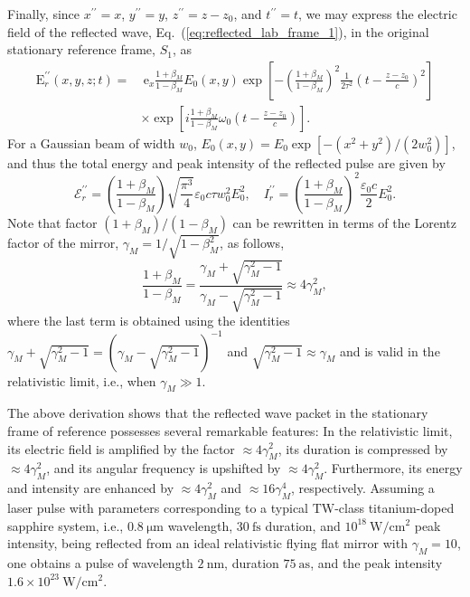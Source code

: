 \documentclass[10pt, a4paper, twoside, openright]{report}
\renewcommand{\vec}[1]{\boldsymbol{\mathrm{#1}}}
\begin{document}
Finally, since $ x^{\prime \prime} = x $, $ y^{\prime \prime} = y $, $ z^{\prime \prime} = z - z_0 $, and $ t^{\prime \prime} = t $, we may express the electric field of the reflected wave, Eq.~(\ref{eq:reflected_lab_frame_1}), in the original stationary reference frame, $ S_1 $, as
\begin{equation}\label{eq:reflected_lab_frame_2}
\begin{split}
\vec{E}^{\prime \prime}_r \left(x, y, z; t \right) = & \ \vec{e}_x \frac{1 + \beta_M}{1 - \beta_M} E_0 \left(x, y \right) \exp \left[ - \left(\frac{1 + \beta_M}{1 - \beta_M}\right)^2 \frac{1}{2 \tau^2} \left(t - \frac{z - z_0}{c}\right)^2 \right] \\ 
& \times \exp \left[ i \frac{1 + \beta_M}{1 - \beta_M} \omega_0 \left(t - \frac{z - z_0}{c}\right) \right].
\end{split}
\end{equation}
For a Gaussian beam of width $ w_0 $, $ E_0 \left( x, y \right) = E_0 \exp \left[-\left( x^2 + y^2 \right) / \left( 2 w_0^2 \right) \right] $, and thus the total energy and peak intensity of the reflected pulse are given by 
\begin{equation}\label{eq:energy_and_intensity}
\mathcal{E}^{\prime \prime}_r = \left(\frac{1 + \beta_M}{1 - \beta_M}\right) \sqrt{\frac{\pi^3}{4}} \varepsilon_0 c \tau w_0^2 E_0^2 , \quad I^{\prime \prime}_r = \left(\frac{1 + \beta_M}{1 - \beta_M}\right)^2 \frac{\varepsilon_0 c}{2} E_0^2.
\end{equation}
Note that factor $ \left(1 + \beta_M \right) / \left(1 - \beta_M \right) $ can be rewritten in terms of the Lorentz factor of the mirror, $ \gamma_M = 1 / \sqrt{1 - \beta_M^2} $, as follows,
\begin{equation}\label{eq:factor}
\frac{1 + \beta_M}{1 - \beta_M} = \frac{\gamma_M + \sqrt{\gamma_M^2 - 1}}{\gamma_M - \sqrt{\gamma_M^2 - 1}} \approx 4 \gamma_M^2,
\end{equation}
where the last term is obtained using the identities $ \gamma_M + \sqrt{\gamma_M^2 - 1} = ( \gamma_M - \sqrt{\gamma_M^2 - 1} )^{-1} $ and $ \sqrt{\gamma_M^2 - 1} \approx \gamma_M $ and is valid in the relativistic limit, i.e., when $ \gamma_M \gg 1 $.

The above derivation shows that the reflected wave packet in the stationary frame of reference possesses several remarkable features: In the relativistic limit, its electric field is amplified by the factor $ \approx 4 \gamma_M^2 $, its duration is compressed by $ \approx 4 \gamma_M^2 $, and its angular frequency is upshifted by $ \approx 4 \gamma_M^2 $. Furthermore, its energy and intensity are enhanced by $ \approx 4 \gamma_M^2 $ and $ \approx 16 \gamma_M^4 $, respectively. Assuming a laser pulse with parameters corresponding to a typical $ \mathrm{TW} $-class titanium-doped sapphire system, i.e., $ 0.8 \ \mathrm{\mu m} $ wavelength, $ 30 \ \mathrm{fs} $ duration, and $ 10^{18} \ \mathrm{W / cm^2} $ peak intensity, being reflected from an ideal relativistic flying flat mirror with $ \gamma_M = 10 $, one obtains a pulse of wavelength $ 2 \ \mathrm{nm} $, duration $ 75 \ \mathrm{as} $, and the peak intensity $ 1.6 \times 10^{23} \ \mathrm{W / cm^2} $.
\end{document}
